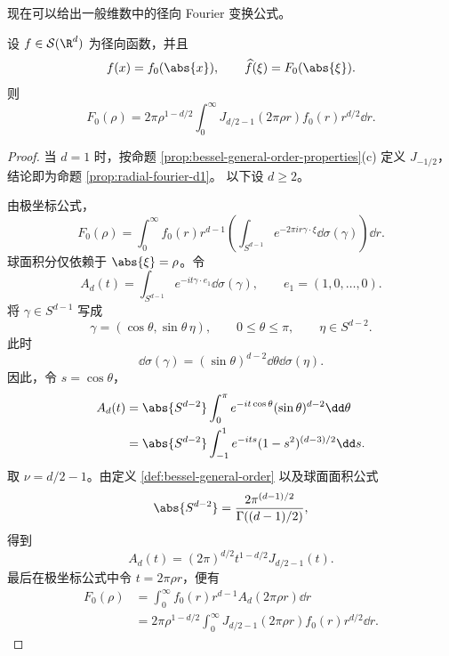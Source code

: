 现在可以给出一般维数中的径向 Fourier 变换公式。

\begin{theorem}\label{thm:radial-fourier-general-d}
	设 $f\in\mathcal S(\R^d)$ 为径向函数，并且
	\[
	f(x)=f_0(\abs{x}),
	\qquad
	\widehat f(\xi)=F_0(\abs{\xi}).
	\]
	则
	\[
	F_0(\rho)
	=2\pi\rho^{1-d/2}\int_0^\infty
	J_{d/2-1}(2\pi\rho r)f_0(r)r^{d/2}\dd r.
	\]
\end{theorem}

\begin{proof}
	当 $d=1$ 时，按命题 \ref{prop:bessel-general-order-properties}(c)
	定义 $J_{-1/2}$，结论即为命题 \ref{prop:radial-fourier-d1}。
	以下设 $d\geq2$。

	由极坐标公式，
	\[
	F_0(\rho)
	=\int_0^\infty f_0(r)r^{d-1}
	\left(\int_{S^{d-1}}e^{-2\pi i r\gamma\cdot\xi}
	\dd\sigma(\gamma)\right)\dd r.
	\]
	球面积分仅依赖于 $\abs{\xi}=\rho$。令
	\[
	A_d(t)=\int_{S^{d-1}}e^{-it\gamma\cdot e_1}
	\dd\sigma(\gamma),
	\qquad e_1=(1,0,\ldots,0).
	\]
	将 $\gamma\in S^{d-1}$ 写成
	\[
	\gamma=(\cos\theta,\sin\theta\,\eta),
	\qquad 0\leq\theta\leq\pi,
	\qquad \eta\in S^{d-2}.
	\]
	此时
	\[
	\dd\sigma(\gamma)
	=(\sin\theta)^{d-2}\dd\theta\dd\sigma(\eta).
	\]
	因此，令 $s=\cos\theta$，
	\[
	\begin{aligned}
	A_d(t)
	&=\abs{S^{d-2}}\int_0^\pi
	e^{-it\cos\theta}(\sin\theta)^{d-2}\dd\theta\\
	&=\abs{S^{d-2}}\int_{-1}^1
	e^{-its}(1-s^2)^{(d-3)/2}\dd s.
	\end{aligned}
	\]
	取 $\nu=d/2-1$。由定义 \ref{def:bessel-general-order} 以及球面面积公式
	\[
	\abs{S^{d-2}}
	=\frac{2\pi^{(d-1)/2}}
	{\Gamma((d-1)/2)},
	\]
	得到
	\[
	A_d(t)=(2\pi)^{d/2}t^{1-d/2}
	J_{d/2-1}(t).
	\]
	最后在极坐标公式中令 $t=2\pi\rho r$，便有
	\[
	\begin{aligned}
	F_0(\rho)
	&=\int_0^\infty f_0(r)r^{d-1}
	A_d(2\pi\rho r)\dd r\\
	&=2\pi\rho^{1-d/2}\int_0^\infty
	J_{d/2-1}(2\pi\rho r)f_0(r)r^{d/2}\dd r.
	\end{aligned}
	\]
\end{proof}


